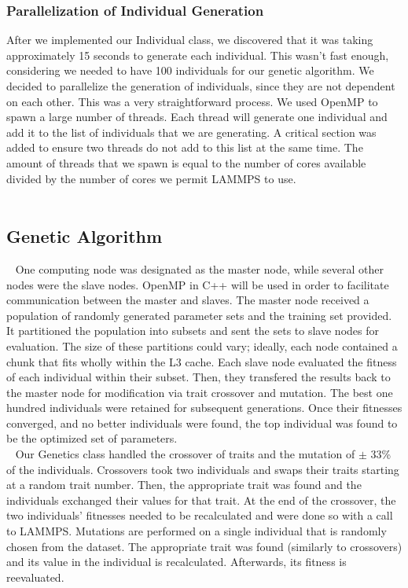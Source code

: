\documentclass[letterpaper, 12pt]{article}
\begin{document}
\begin{flushleft}
\subsubsection*{Parallelization of Individual Generation}

After we implemented our Individual class, we discovered that it was taking approximately 15 seconds to generate each individual. This wasn't fast enough, considering we needed to have 100 individuals for our genetic algorithm. We decided to parallelize the generation of individuals, since they are not dependent on each other. This was a very straightforward process. We used OpenMP to spawn a large number of threads. Each thread will generate one individual and add it to the list of individuals that we are generating. A critical section was added to ensure two threads do not add to this list at the same time. The amount of threads that we spawn is equal to the number of cores available divided by the number of cores we permit LAMMPS to use. \\
~\newline

 


\subsection*{Genetic Algorithm}

~\newline
One computing node was designated as the master node, while several other nodes were the slave nodes.  OpenMP in C++ will be used in order to facilitate communication between the master and slaves. The master node received a population of randomly generated parameter sets and the training set provided.  It partitioned the population into subsets and sent the sets to slave nodes for evaluation.  The size of these partitions could vary; ideally, each node contained a chunk that fits wholly within the L3 cache. Each slave node evaluated the fitness of each individual within their subset. Then, they transfered the results back to the  master node for modification via trait crossover and mutation. The best one hundred individuals were retained for subsequent generations.  Once their fitnesses converged, and no better individuals were found, the top individual was found to be the optimized set of parameters.\\

~\newline
Our Genetics class handled the crossover of traits and the mutation of $\pm$ 33\% of the individuals.  Crossovers took two individuals and swaps their traits starting at a random trait number.  Then, the appropriate trait was found and the individuals exchanged their values for that trait.  At the end of the crossover, the two individuals' fitnesses needed to be recalculated and were done so with a call to LAMMPS.  Mutations are performed on a single individual that is randomly chosen from the dataset.  The appropriate trait was found (similarly to crossovers) and its value in the individual is recalculated.  Afterwards, its fitness is reevaluated. \\


\end{flushleft}
\end{document}

